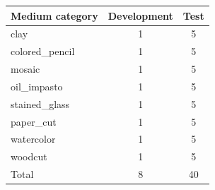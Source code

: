 \begin{tabular}{lcc}
\toprule
Medium category & Development & Test \\
\midrule
clay & 1 & 5 \\
colored\_pencil & 1 & 5 \\
mosaic & 1 & 5 \\
oil\_impasto & 1 & 5 \\
stained\_glass & 1 & 5 \\
paper\_cut & 1 & 5 \\
watercolor & 1 & 5 \\
woodcut & 1 & 5 \\
\midrule
Total & 8 & 40 \\
\bottomrule
\end{tabular}
